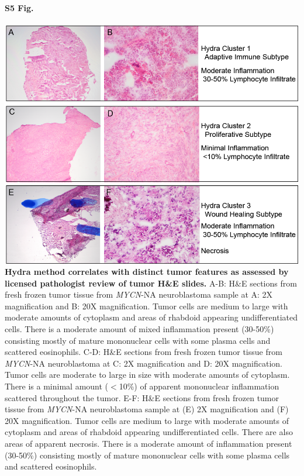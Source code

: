 \documentclass[10pt,letterpaper]{article}
\begin{document}
\paragraph*{S5 Fig.}
\includegraphics[width=\textwidth]{img/PNG/HE-Figure-3-Clusters-2x}
\label{S5_Fig} {\bf Hydra method correlates with distinct tumor features as assessed by licensed pathologist review of tumor H\&E slides.}
A-B: H\&E sections from fresh frozen tumor tissue from \textit{MYCN}-NA neuroblastoma sample at A: 2X magnification and B: 20X magnification. Tumor cells are medium to large with moderate amounts of cytoplasm and areas of rhabdoid appearing undifferentiated cells.  There is a moderate amount of mixed inflammation present (30-50\%) consisting mostly of mature mononuclear cells with some plasma cells and scattered eosinophils. C-D: H\&E sections from fresh frozen tumor tissue from \textit{MYCN}-NA neuroblastoma at C: 2X magnification and D: 20X magnification. Tumor cells are moderate to large in size with moderate amounts of cytoplasm. There is a minimal amount ($<$10\%) of apparent mononuclear inflammation scattered throughout the tumor. E-F: H\&E sections from fresh frozen tumor tissue from \textit{MYCN}-NA neuroblastoma sample at (E) 2X magnification and (F) 20X magnification.  Tumor cells are medium to large with moderate amounts of cytoplasm and areas of rhabdoid appearing undifferentiated cells.  There are also areas of apparent necrosis.  There is a moderate amount of inflammation present (30-50\%) consisting mostly of mature mononuclear cells with some plasma cells and scattered eosinophils.
\end{document}
